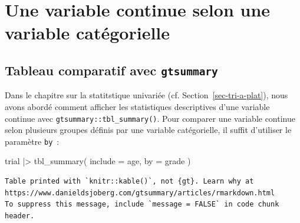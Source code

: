 \documentclass[
  letterpaper,
  DIV=11,
  numbers=noendperiod,
  oneside]{scrreprt}
\newenvironment{Shaded}{\begin{snugshade}}{\end{snugshade}}
\newcommand{\AttributeTok}[1]{\textcolor[rgb]{0.40,0.45,0.13}{#1}}
\newcommand{\FunctionTok}[1]{\textcolor[rgb]{0.28,0.35,0.67}{#1}}
\newcommand{\NormalTok}[1]{\textcolor[rgb]{0.00,0.23,0.31}{#1}}
\newcommand{\SpecialCharTok}[1]{\textcolor[rgb]{0.37,0.37,0.37}{#1}}
\begin{document}
\hypertarget{une-variable-continue-selon-une-variable-catuxe9gorielle}{%
\section{Une variable continue selon une variable
catégorielle}\label{une-variable-continue-selon-une-variable-catuxe9gorielle}}

\hypertarget{tableau-comparatif-avec-gtsummary}{%
\subsection{\texorpdfstring{Tableau comparatif avec
\texttt{gtsummary}}{Tableau comparatif avec gtsummary}}\label{tableau-comparatif-avec-gtsummary}}

Dans le chapitre sur la statitstique univariée (cf.
Section~\ref{sec-tri-a-plat}), nous avons abordé comment afficher les
statistiques descriptives d'une variable continue avec
\texttt{gtsummary::tbl\_summary()}. Pour comparer une variable continue
selon plusieurs groupes définis par une variable catégorielle, il suffit
d'utiliser le paramètre \texttt{by}~:

\begin{Shaded}
\begin{Highlighting}[]
\NormalTok{trial }\SpecialCharTok{|\textgreater{}} 
  \FunctionTok{tbl\_summary}\NormalTok{(}
    \AttributeTok{include =}\NormalTok{ age,}
    \AttributeTok{by =}\NormalTok{ grade}
\NormalTok{  )}
\end{Highlighting}
\end{Shaded}

\begin{verbatim}
Table printed with `knitr::kable()`, not {gt}. Learn why at
https://www.danieldsjoberg.com/gtsummary/articles/rmarkdown.html
To suppress this message, include `message = FALSE` in code chunk header.
\end{verbatim}
\end{document}
